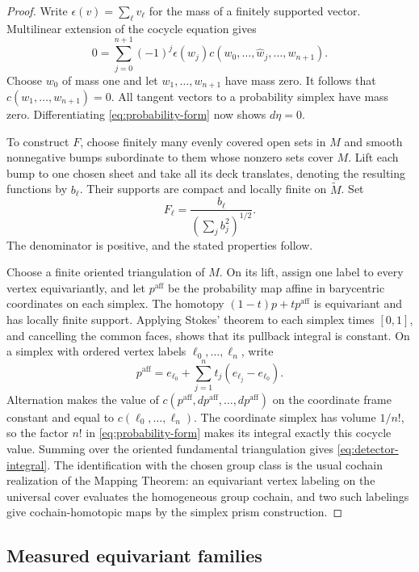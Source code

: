 \begin{proof}
Write \(\epsilon(v)=\sum_\ell v_\ell\) for the mass of a finitely
supported vector. Multilinear extension of the cocycle equation gives
\[
0=\sum_{j=0}^{n+1}(-1)^j\epsilon(w_j)
 c(w_0,\ldots,\widehat w_j,\ldots,w_{n+1}).
\]
Choose \(w_0\) of mass one and let \(w_1,\ldots,w_{n+1}\) have mass
zero. It follows that \(c(w_1,\ldots,w_{n+1})=0\). All tangent vectors
to a probability simplex have mass zero. Differentiating
\eqref{eq:probability-form} now shows \(d\eta=0\).

To construct \(F\), choose finitely many evenly covered open sets in
\(M\) and smooth nonnegative bumps subordinate to them whose nonzero
sets cover \(M\). Lift each bump to one chosen sheet and take all its
deck translates, denoting the resulting functions by \(b_\ell\).
Their supports are compact and locally finite on \(\widetilde M\).
Set
\[
 F_\ell=\frac{b_\ell}{\left(\sum_j b_j^2\right)^{1/2}}.
\]
The denominator is positive, and the stated properties follow.

Choose a finite oriented triangulation of \(M\). On its lift, assign
one label to every vertex equivariantly, and let \(p^{\mathrm{aff}}\)
be the probability map affine in barycentric coordinates on each
simplex. The homotopy
\((1-t)p+t p^{\mathrm{aff}}\) is equivariant and has locally finite
support. Applying Stokes' theorem to each simplex times \([0,1]\), and
cancelling the common faces, shows that its pullback integral is
constant. On a simplex with ordered vertex labels
\(\ell_0,\ldots,\ell_n\), write
\[
p^{\mathrm{aff}}=e_{\ell_0}
+\sum_{j=1}^nt_j(e_{\ell_j}-e_{\ell_0}).
\]
Alternation makes the value of
\(c(p^{\mathrm{aff}},dp^{\mathrm{aff}},\ldots,dp^{\mathrm{aff}})\)
on the coordinate frame constant and equal to
\(c(\ell_0,\ldots,\ell_n)\). The coordinate simplex has volume
\(1/n!\), so the factor \(n!\) in \eqref{eq:probability-form} makes its
integral exactly this cocycle value. Summing over the oriented
fundamental triangulation gives \eqref{eq:detector-integral}. The
identification with the chosen group class is the usual cochain
realization of the Mapping Theorem: an equivariant vertex labeling on
the universal cover evaluates the homogeneous group cochain, and two
such labelings give cochain-homotopic maps by the simplex prism
construction.
\end{proof}

\subsection{Measured equivariant families}

